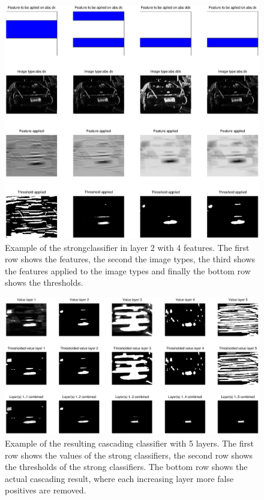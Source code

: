 \documentclass[a4paper,11pt]{article}
\begin{document}
\begin{figure}[!ht]
\centering
\includegraphics[width=16cm]{img/strongClassifier_layer2_img14}
\caption{Example of the strongclassifier in layer 2 with 4 features. The first
row shows the features, the second the image types, the third shows the
features applied to the image types and finally the bottom row shows the
thresholds.}
\label{fig:strongclassify}
\end{figure}

\begin{figure}[!ht]
\centering
\includegraphics[width=16cm]{img/cascader_img14}
\caption{Example of the resulting cascading classifier with 5 layers. The first
row shows the values of the strong classifiers, the second row shows the
thresholds of the strong classifiers. The bottom row shows the actual cascading
result, where each increasing layer more false positives are removed.}
\label{fig:cascader}
\end{figure}
\end{document}
